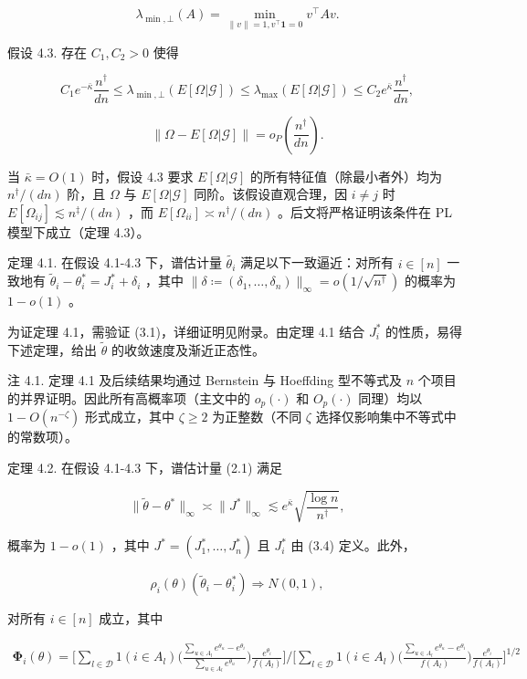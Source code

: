 $$
\lambda_{\min ,\bot}(A) = \min_{\| v\| = 1,v^{\top}\mathbf{1} = 0}v^{\top}A v.
$$

假设 4.3. 存在 $C_1,C_2 > 0$ 使得

\[
C_1e^{-\bar{\kappa}}\frac{n^\dagger}{dn}\leq \lambda_{\min ,\bot}(E[\Omega |\mathcal{G}])\leq \lambda_{\max}(E[\Omega |\mathcal{G}])\leq C_2e^{\bar{\kappa}}\frac{n^\dagger}{dn}, \tag{4.1}
\]

\[
\| \Omega -E[\Omega |\mathcal{G}]\| = o_{P}\left(\frac{n^{\dagger}}{dn}\right). \tag{4.2}
\]

当 $\bar{\kappa} = O(1)$ 时，假设 4.3 要求 $E[\Omega |\mathcal{G}]$ 的所有特征值（除最小者外）均为 $n^{\dagger}/(dn)$ 阶，且 $\Omega$ 与 $E[\Omega |\mathcal{G}]$ 同阶。该假设直观合理，因 $i\neq j$ 时 $E[\Omega_{ij}]\lesssim n^{\ddagger}/(dn)$ ，而 $E[\Omega_{ii}]\asymp n^{\dagger}/(dn)$ 。后文将严格证明该条件在 PL 模型下成立（定理 4.3）。

定理 4.1. 在假设 4.1-4.3 下，谱估计量 $\widetilde{\theta_{i}}$ 满足以下一致逼近：对所有 $i\in [n]$ 一致地有 $\widetilde{\theta}_{i} - \theta_{i}^{*} = J_{i}^{*} + \delta_{i}$ ，其中 $\| \delta \coloneqq (\delta_{1},\dots ,\delta_{n})\|_{\infty} = o(1 / \sqrt{n^{\dagger}})$ 的概率为 $1 - o(1)$ 。

为证定理 4.1，需验证 (3.1)，详细证明见附录。由定理 4.1 结合 $J_{i}^{*}$ 的性质，易得下述定理，给出 $\widetilde{\theta}$ 的收敛速度及渐近正态性。

注 4.1. 定理 4.1 及后续结果均通过 Bernstein 与 Hoeffding 型不等式及 $n$ 个项目的并界证明。因此所有高概率项（主文中的 $o_{p}(\cdot)$ 和 $O_{p}(\cdot)$ 同理）均以 $1 - O(n^{-\zeta})$ 形式成立，其中 $\zeta \geq 2$ 为正整数（不同 $\zeta$ 选择仅影响集中不等式中的常数项）。

定理 4.2. 在假设 4.1-4.3 下，谱估计量 (2.1) 满足

\[
\| \widetilde{\theta} -\theta^{*}\|_{\infty}\asymp \| J^{*}\|_{\infty}\lesssim e^{\bar{\kappa}}\sqrt{\frac{\log n}{n^{\dagger}}}, \tag{4.3}
\]

概率为 $1 - o(1)$ ，其中 $J^{*} = (J_{1}^{*},\dots ,J_{n}^{*})$ 且 $J_{i}^{*}$ 由 (3.4) 定义。此外，

$$
\rho_{i}(\theta)(\widetilde{\theta}_{i} - \theta_{i}^{*})\Rightarrow N(0,1),
$$

对所有 $i\in [n]$ 成立，其中

$$
\begin{array}{r}{\mathbf{\Phi}_{i}(\theta) = \Big[\sum_{l\in \mathcal{D}}1(i\in A_{l})\Big(\frac{\sum_{u\in A_{l}}e^{\theta_{u}} - e^{\theta_{i}}}{\sum_{u\in A_{l}}e^{\theta_{u}}}\Big)\frac{e^{\theta_{i}}}{f(A_{l})}\Big] \Big/ \Big[\sum_{l\in \mathcal{D}}1(i\in A_{l})\Big(\frac{\sum_{u\in A_{l}}e^{\theta_{u}} - e^{\theta_{i}}}{f(A_{l})}\Big)\frac{e^{\theta_{i}}}{f(A_{l})}\Big]^{1 / 2}} \end{array}
$$

